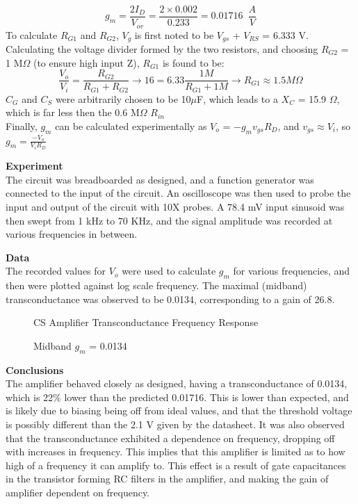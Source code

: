 \documentclass[12pt]{article}
\begin{document}
\begin{equation}
g_m = \frac{2I_D}{V_{ov}} = \frac{2\times 0.002}{0.233} = 0.01716\hspace{6pt} \frac{A}{V}
\end{equation}
To calculate $R_{G1}$ and $R_{G2}$, $V_{g}$ is first noted to be $V_{gs}$ + $V_{RS}$ = 6.333 V. Calculating the voltage divider formed by the two resistors, and choosing $R_{G2}$ = 1 M$\Omega$ (to ensure high input Z), $R_{G1}$ is found to be:
\begin{equation}
\frac{V_o}{V_i} = \frac{R_{G2}}{R_{G1}+R_{G2}} \rightarrow 16 = 6.33 \frac{1M}{R_{G1} + 1M}\rightarrow R_{G1} \approx 1.5 M\Omega
\end{equation}
$C_G$ and $C_S$ were arbitrarily chosen to be 10$\mu$F, which leads to a $X_C$ = 15.9 $\Omega$, which is far less then the 0.6 M$\Omega$ $R_{in}$\\

Finally, $g_m$ can be calculated experimentally as $V_o$ = $-g_m v_{gs} R_D$, and $v_{gs} \approx V_i$, so $g_m = \frac{-V_o}{V_i R_D}$\\\par

\textbf{Experiment}\\
The circuit was breadboarded as designed, and a function generator was connected to the input of the circuit. An oscilloscope was then used to probe the input and output of the circuit with 10X probes. A 78.4 mV input sinusoid was then swept from 1 kHz to 70 KHz, and the signal amplitude was recorded at various frequencies in between.\\\par
\textbf{Data}\\The recorded values for $V_o$ were used to calculate $g_m$ for various frequencies, and then were plotted against log scale frequency. The maximal (midband) transconductance was observed to be 0.0134, corresponding to a gain of 26.8.
\FloatBarrier
\begin{figure}[h!]
\begin{center}
    	\resizebox{0.6\textwidth}{!}{}
\end{center}
\caption{CS Amplifier Transconductance Frequency Response}
\caption*{Midband $g_m$ = 0.0134}
\end{figure}
\FloatBarrier
\textbf{Conclusions}\\
The amplifier behaved closely as designed, having a transconductance of 0.0134, which is 22\% lower than the predicted 0.01716. This is lower than expected, and is likely due to biasing being off from ideal values, and that the threshold voltage is possibly different than the 2.1 V given by the datasheet. It was also observed that the transconductance exhibited a dependence on frequency, dropping off with increases in frequency. This implies that this amplifier is limited as to how high of a frequency it can amplify to. This effect is a result of gate capacitances in the transistor forming RC filters in the amplifier, and making the gain of amplifier dependent on frequency. 
\end{document}
